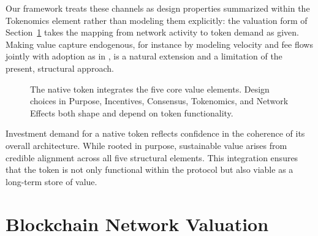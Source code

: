 \documentclass[12pt]{article}
\begin{document}
Our framework treats these channels as design properties summarized within the Tokenomics element rather than modeling them explicitly: the valuation form of Section~\ref{sec:valuation_framework} takes the mapping from network activity to token demand as given. Making value capture endogenous, for instance by modeling velocity and fee flows jointly with adoption as in \citet{cong2021tokenomics}, is a natural extension and a limitation of the present, structural approach.


\begin{figure}[H]
\centering
{}
\caption{The native token integrates the five core value elements. Design choices in Purpose, Incentives, Consensus, Tokenomics, and Network Effects both shape and depend on token functionality.}
\label{fig:native_token_coordination}
\end{figure}

\begin{tcolorbox}[title=\textbf{Remark: Investment Appeal as Emergent Integration}]
Investment demand for a native token reflects confidence in the coherence of its overall architecture. While rooted in purpose, sustainable value arises from credible alignment across all five structural elements. This integration ensures that the token is not only functional within the protocol but also viable as a long-term store of value.
\end{tcolorbox}





\section{Blockchain Network Valuation}
\label{sec:valuation_framework}
\end{document}

